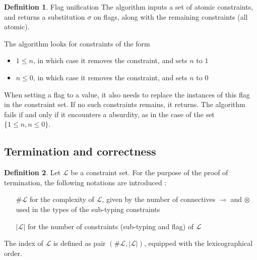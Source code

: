 \documentclass[9pt]{article}
\theoremstyle{plain}
\theoremstyle{definition}
\newtheorem{defn}{Definition}[subsection] %
\begin{document}
\begin{defn}{Flag unification}
	The algorithm inputs a set of atomic constraints, and returns a substitution $\sigma$ on flags, along with
	the remaining constraints (all atomic).
	
	The algorithm looks for constraints of the form
	\begin{itemize}
		\item $1 \le n$, in which case it removes the constraint, and sets $n$ to $1$
		\item $n \le 0$, in which case it removes the constraint, and sets $n$ to $0$
	\end{itemize}	
	When setting a flag to a value, it also needs to replace the instances of this flag in the constraint set.
	If no such constraints remains, it returns. The algorithm fails if and only if it encounters a absurdity,
	as in the case of the set $\{ 1 \le n, n \le 0 \}$.
\end{defn}

\subsection{Termination and correctness}

\begin{defn} Let $\mathcal{L}$ be a constraint set. For the purpose of the proof of termination, the following notations are introduced :
	\begin{itemize}
		\item[$\#\mathcal{L}$] for the complexity of $\mathcal{L}$, given by the number of connectives $\multimap$ and
			$\otimes$ used in the types of the sub-typing constraints
		\item[$|\mathcal{L}|$] for the number of constraints (sub-typing and flag) of $\mathcal{L}$
	\end{itemize}
	The index of $\mathcal{L}$ is defined as pair $(\#\mathcal{L}, |\mathcal{L}|)$, equipped with the lexicographical order.
\end{defn}
\end{document}
